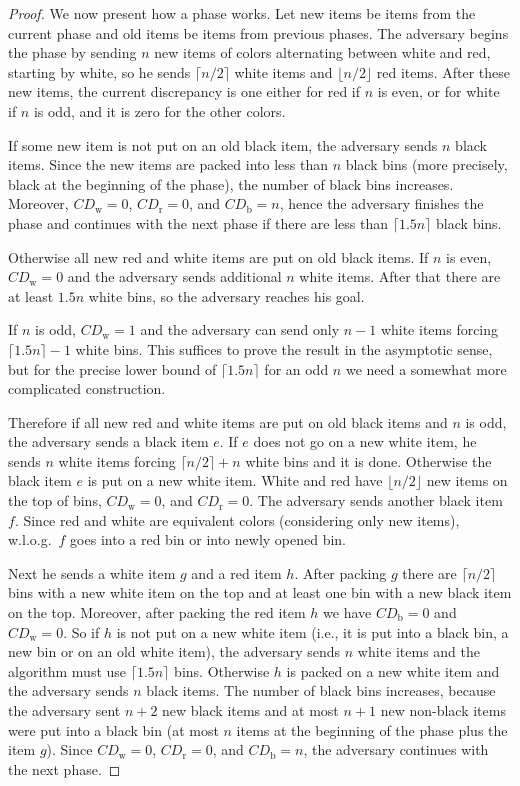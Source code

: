 \documentclass[11pt,a4paper]{article}
\def\vari#1{\mathit{#1}}
\begin{document}
\begin{proof}
We now present how a phase works. Let new items be items from the current phase and
old items be items from previous phases.
The adversary begins the phase by sending $n$ new items of colors alternating between
white and red, starting by white, so he sends $\lceil n/2\rceil$
white items and $\lfloor n/2\rfloor$ red items.
After these new items, the current discrepancy is one either for red if $n$ is even,
or for white if $n$ is odd, and it is zero for the other colors.

If some new item is not put on an old black item, 
the adversary sends $n$ black items. Since the new items are packed into less
than $n$ black bins (more precisely, black at the beginning of the phase),
the number of black bins increases. Moreover, $\vari{CD}_{\mathrm{w}} = 0$,
$\vari{CD}_{\mathrm{r}} = 0$, and $\vari{CD}_{\mathrm{b}} = n$,
hence the adversary finishes the phase and continues with the next phase if there are
less than $\lceil 1.5n \rceil$ black bins.

Otherwise all new red and white items are put on old black items. If
$n$ is even, $\vari{CD}_{\mathrm{w}} = 0$ and the adversary sends additional $n$
white items. After that there are at least $1.5n$ white bins, so the adversary
reaches his goal.

If $n$ is odd, $\vari{CD}_{\mathrm{w}} = 1$ and the adversary
can send only $n-1$ white items forcing $\lceil 1.5n\rceil - 1$ white bins.
This suffices to prove the result in the asymptotic sense,
but for the precise lower bound of $\lceil 1.5n\rceil$
for an odd $n$ we need a somewhat more complicated construction.

Therefore if all new red and white items are put on old black items and
$n$ is odd, the adversary sends a black item $e$.
If $e$ does not go on a new white item, he sends $n$ white items
forcing $\lceil n/2\rceil + n$ white bins and it is done.
Otherwise the black item $e$ is put on a new white item.
White and red have $\lfloor n/2\rfloor$ new items on the top of bins,
$\vari{CD}_{\mathrm{w}} = 0$, and $\vari{CD}_{\mathrm{r}} = 0$. 
The adversary sends another black item $f$.
Since red and white are equivalent colors (considering only new items),
w.l.o.g.\ $f$ goes into a red bin or into newly opened bin.

Next he sends a white item $g$ and a red item $h$.
After packing $g$ there are $\lceil n/2\rceil$ bins with a new
white item on the top and at least one bin with a new black item on the top.
Moreover, after packing the red item $h$ we have
$\vari{CD}_{\mathrm{b}} = 0$ and $\vari{CD}_{\mathrm{w}} = 0$.
So if $h$ is not put on a new white item (i.e., it is put into a black
bin, a new bin or on an old white item), the adversary sends $n$ white items
and the algorithm must use $\lceil 1.5n\rceil$ bins.
Otherwise $h$ is packed on a new white item and the adversary sends $n$ black items.
The number of black bins increases, because the adversary sent $n+2$ new black
items and at most $n+1$ new non-black items were put into a black bin
(at most $n$ items at the beginning of the phase plus the item $g$).
Since $\vari{CD}_{\mathrm{w}} = 0$, $\vari{CD}_{\mathrm{r}} = 0$, and
$\vari{CD}_{\mathrm{b}} = n$,
the adversary continues with the next phase.
\end{proof}
\end{document}

